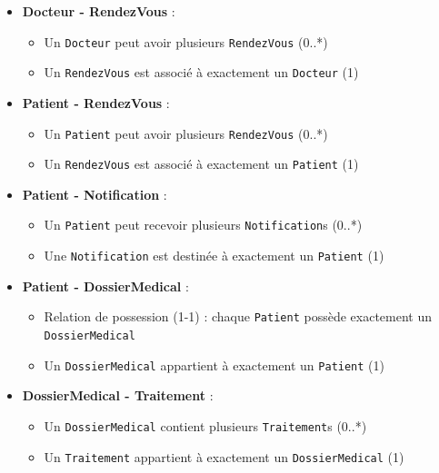 \documentclass[12pt,a4paper]{report}
\begin{document}
\begin{itemize}
    \item \textbf{Docteur - RendezVous} : 
    \begin{itemize}
        \item Un \texttt{Docteur} peut avoir plusieurs \texttt{RendezVous} (0..*)
        \item Un \texttt{RendezVous} est associé à exactement un \texttt{Docteur} (1)
    \end{itemize}
    
    \item \textbf{Patient - RendezVous} : 
    \begin{itemize}
        \item Un \texttt{Patient} peut avoir plusieurs \texttt{RendezVous} (0..*)
        \item Un \texttt{RendezVous} est associé à exactement un \texttt{Patient} (1)
    \end{itemize}
    
    \item \textbf{Patient - Notification} : 
    \begin{itemize}
        \item Un \texttt{Patient} peut recevoir plusieurs \texttt{Notification}s (0..*)
        \item Une \texttt{Notification} est destinée à exactement un \texttt{Patient} (1)
    \end{itemize}
    
    \item \textbf{Patient - DossierMedical} : 
    \begin{itemize}
        \item Relation de possession (1-1) : chaque \texttt{Patient} possède exactement un \texttt{DossierMedical}
        \item Un \texttt{DossierMedical} appartient à exactement un \texttt{Patient} (1)
    \end{itemize}
    
    \item \textbf{DossierMedical - Traitement} : 
    \begin{itemize}
        \item Un \texttt{DossierMedical} contient plusieurs \texttt{Traitement}s (0..*)
        \item Un \texttt{Traitement} appartient à exactement un \texttt{DossierMedical} (1)
    \end{itemize}
\end{itemize}
\end{document}

